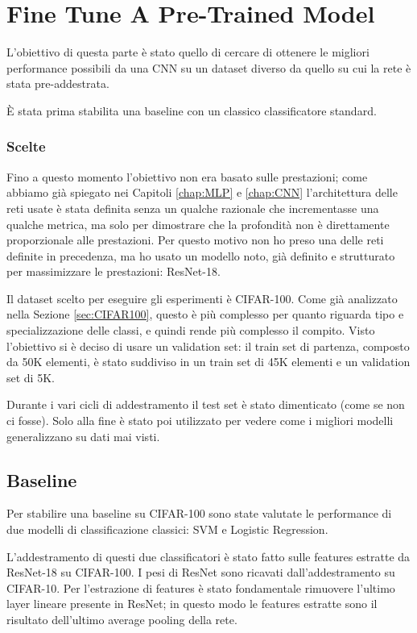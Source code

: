 \chapter{Fine Tune A Pre-Trained Model}
L'obiettivo di questa parte è stato quello di cercare di ottenere le migliori performance possibili da una CNN su un dataset diverso da quello su cui la rete è stata pre-addestrata.

È stata prima stabilita una baseline con un classico classificatore standard.

\subsection{Scelte}
Fino a questo momento l'obiettivo non era basato sulle prestazioni; come abbiamo già spiegato nei Capitoli \ref{chap:MLP} e \ref{chap:CNN} l'architettura delle reti usate è stata definita senza un qualche razionale che incrementasse una qualche metrica, ma solo per dimostrare che la profondità non è direttamente proporzionale alle prestazioni. Per questo motivo non ho preso una delle reti definite in precedenza, ma ho usato un modello noto, già definito e strutturato per massimizzare le prestazioni: ResNet-18.

\myskip

Il dataset scelto per eseguire gli esperimenti è CIFAR-100. Come già analizzato nella Sezione \ref{sec:CIFAR100}, questo è più complesso per quanto riguarda tipo e specializzazione delle classi, e quindi rende più complesso il compito. Visto l'obiettivo si è deciso di usare un validation set: il train set di partenza, composto da 50K elementi, è stato suddiviso in un train set di 45K elementi e un validation set di 5K.

Durante i vari cicli di addestramento il test set è stato dimenticato (come se non ci fosse). Solo alla fine è stato poi utilizzato per vedere come i migliori modelli generalizzano su dati mai visti.

\section{Baseline}
Per stabilire una baseline su CIFAR-100 sono state valutate le performance di due modelli di classificazione classici: SVM e Logistic Regression.

\myskip

L'addestramento di questi due classificatori è stato fatto sulle features estratte da ResNet-18 su CIFAR-100. I pesi di ResNet sono ricavati dall'addestramento su CIFAR-10. Per l'estrazione di features è stato fondamentale rimuovere l'ultimo layer lineare presente in ResNet; in questo modo le features estratte sono il risultato dell'ultimo average pooling della rete.

